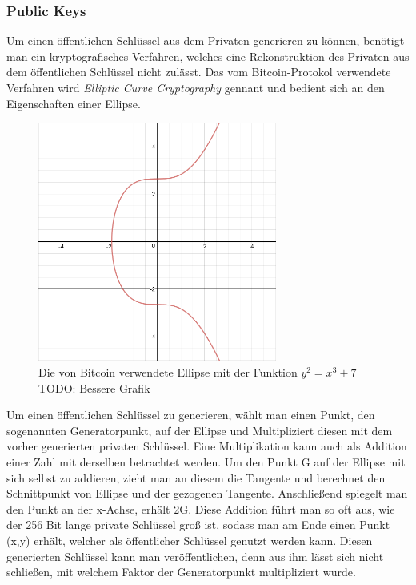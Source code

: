 \subsubsection{Public Keys}
Um einen öffentlichen Schlüssel aus dem Privaten generieren zu können, benötigt man ein kryptografisches Verfahren, welches eine Rekonstruktion des Privaten aus dem öffentlichen Schlüssel nicht zulässt.
Das vom Bitcoin-Protokol verwendete Verfahren wird \emph{Elliptic Curve Cryptography} gennant und bedient sich an den Eigenschaften einer Ellipse.
\begin{figure}[htpb]
	\centering
	\includegraphics[width=0.7\textwidth]{images/elliptic_graph_cryptography.png}
	\caption{Die von Bitcoin verwendete Ellipse mit der Funktion $y^{2} = x^{3} + 7$ \\TODO: Bessere Grafik}
	\label{6braun:fig:ellipse}
\end{figure}
Um einen öffentlichen Schlüssel zu generieren, wählt man einen Punkt, den sogenannten Generatorpunkt, auf der Ellipse und Multipliziert diesen mit dem vorher generierten privaten Schlüssel. Eine Multiplikation kann auch als Addition einer Zahl mit derselben betrachtet werden. Um den Punkt G auf der Ellipse mit sich selbst zu addieren, zieht man an diesem die Tangente und berechnet den Schnittpunkt von Ellipse und der gezogenen Tangente. Anschließend spiegelt man den Punkt an der x-Achse, erhält 2G. Diese Addition führt man so oft aus, wie der 256 Bit lange private Schlüssel groß ist, sodass man am Ende einen Punkt (x,y) erhält, welcher als öffentlicher Schlüssel genutzt werden kann. Diesen generierten Schlüssel kann man veröffentlichen, denn aus ihm lässt sich nicht schließen, mit welchem Faktor der Generatorpunkt multipliziert wurde.

